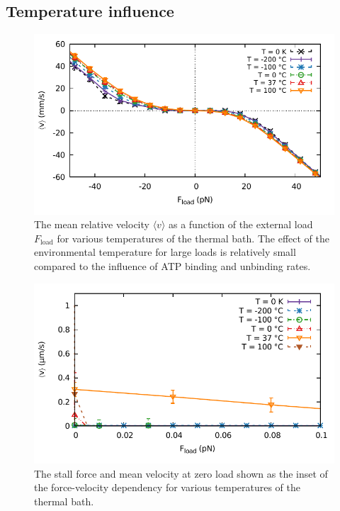 \documentclass[aps,pre,twocolumn,showpacs,showkeys,superscriptaddress,floatfix]{revtex4-1}
\begin{document}
\subsection{Temperature influence}
\begin{figure}[t]
\centering
\includegraphics[width=.9\linewidth,height=!]{F_v_temp}
\caption{
\label{fig:F_v_temp}
The mean relative velocity $\langle v \rangle$ as a function of the external load $F_\text{load}$ for various temperatures of the thermal bath.
The effect of the environmental temperature for large loads is relatively small compared to the influence of ATP binding and unbinding rates.  
}
\end{figure}

\begin{figure}[t]
\centering
\includegraphics[width=.9\linewidth,height=!]{F_v_temp_zoom}
\caption{
\label{fig:F_v_temp_zoom}
The stall force and mean velocity at zero load shown as the inset of the force-velocity dependency for various temperatures of the thermal bath.
}
\end{figure}
\end{document}
